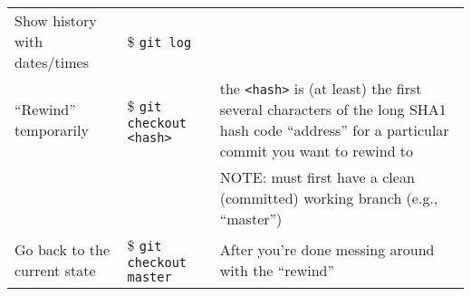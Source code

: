 \documentclass[]{article}
\begin{document}
\begin{center}
\begin{tabular}{llp{2.5in}}
 Show history with dates/times  &  \$ \texttt{git log}                                 &                                                                                                                                                                         \\
 ``Rewind'' temporarily         &  \$ \texttt{git checkout <hash>}                     &  the \texttt{<hash>} is (at least) the first several characters of the long SHA1 hash code ``address'' for a particular commit you want to rewind to                    \\
                                &                                                      &  NOTE: must first have a clean (committed) working branch (e.g., ``master'')                                                                                            \\
 Go back to the current state   &  \$ \texttt{git checkout master}                     &  After you're done messing around with the ``rewind''                                                                                                                   \\
\end{tabular}
\end{center}



  
\end{document}
